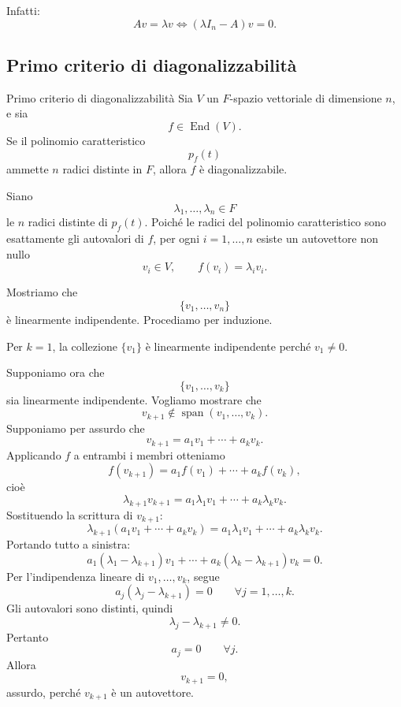 \documentclass[a4paper]{article}
\begin{document}
Infatti:
\[
    Av=\lambda v
    \Longleftrightarrow
    (\lambda I_n-A)v=0.
\]

\subsection{Primo criterio di diagonalizzabilità}

\begin{snippettheorem}{Primo criterio di diagonalizzabilità}
    Sia \(V\) un \(F\)-spazio vettoriale di dimensione \(n\), e sia
    \[
        f\in\operatorname{End}(V).
    \]
    Se il polinomio caratteristico
    \[
        p_f(t)
    \]
    ammette \(n\) radici distinte in \(F\), allora \(f\) è diagonalizzabile.
\end{snippettheorem}

\begin{snippetproof}{}
    Siano
    \[
        \lambda_1,\ldots,\lambda_n\in F
    \]
    le \(n\) radici distinte di \(p_f(t)\). Poiché le radici del polinomio caratteristico sono esattamente gli autovalori di \(f\), per ogni \(i=1,\ldots,n\) esiste un autovettore non nullo
    \[
        v_i\in V,
        \qquad
        f(v_i)=\lambda_i v_i.
    \]

    Mostriamo che
    \[
        \{v_1,\ldots,v_n\}
    \]
    è linearmente indipendente. Procediamo per induzione.

    Per \(k=1\), la collezione \(\{v_1\}\) è linearmente indipendente perché \(v_1\neq 0\).

    Supponiamo ora che
    \[
        \{v_1,\ldots,v_k\}
    \]
    sia linearmente indipendente. Vogliamo mostrare che
    \[
        v_{k+1}\notin\operatorname{span}(v_1,\ldots,v_k).
    \]
    Supponiamo per assurdo che
    \[
        v_{k+1}
        =
        a_1v_1+\cdots+a_kv_k.
    \]
    Applicando \(f\) a entrambi i membri otteniamo
    \[
        f(v_{k+1})
        =
        a_1f(v_1)+\cdots+a_kf(v_k),
    \]
    cioè
    \[
        \lambda_{k+1}v_{k+1}
        =
        a_1\lambda_1v_1+\cdots+a_k\lambda_kv_k.
    \]
    Sostituendo la scrittura di \(v_{k+1}\):
    \[
        \lambda_{k+1}(a_1v_1+\cdots+a_kv_k)
        =
        a_1\lambda_1v_1+\cdots+a_k\lambda_kv_k.
    \]
    Portando tutto a sinistra:
    \[
        a_1(\lambda_1-\lambda_{k+1})v_1
        +\cdots+
        a_k(\lambda_k-\lambda_{k+1})v_k
        =
        0.
    \]
    Per l'indipendenza lineare di \(v_1,\ldots,v_k\), segue
    \[
        a_j(\lambda_j-\lambda_{k+1})=0
        \qquad
        \forall j=1,\ldots,k.
    \]
    Gli autovalori sono distinti, quindi
    \[
        \lambda_j-\lambda_{k+1}\neq 0.
    \]
    Pertanto
    \[
        a_j=0
        \qquad
        \forall j.
    \]
    Allora
    \[
        v_{k+1}=0,
    \]
    assurdo, perché \(v_{k+1}\) è un autovettore.


\end{snippetproof}
\end{document}
